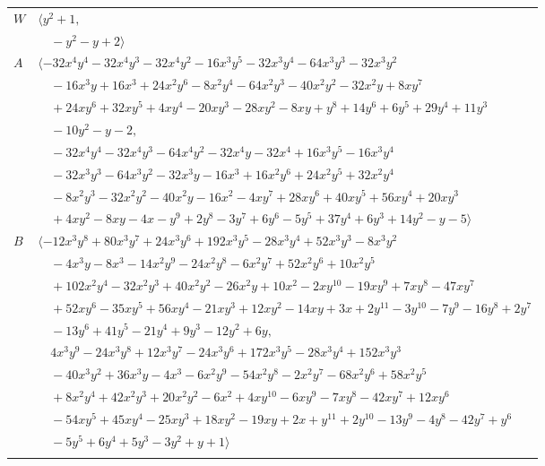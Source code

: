 \documentclass[11pt]{article}
\begin{document}
\begin{longtable}{@{}ll@{}}
$W$ & $\langle y^{2}+1,$\\
 & $\quad -y^{2}-y+2\rangle$\\
$A$ & $\langle -32x^{4}y^{4}-32x^{4}y^{3}-32x^{4}y^{2}-16x^{3}y^{5}-32x^{3}y^{4}-64x^{3}y^{3}-32x^{3}y^{2}$\\
 & $\quad -16x^{3}y+16x^{3}+24x^{2}y^{6}-8x^{2}y^{4}-64x^{2}y^{3}-40x^{2}y^{2}-32x^{2}y+8xy^{7}$\\
 & $\quad +24xy^{6}+32xy^{5}+4xy^{4}-20xy^{3}-28xy^{2}-8xy+y^{8}+14y^{6}+6y^{5}+29y^{4}+11y^{3}$\\
 & $\quad -10y^{2}-y-2,$\\
 & $\quad -32x^{4}y^{4}-32x^{4}y^{3}-64x^{4}y^{2}-32x^{4}y-32x^{4}+16x^{3}y^{5}-16x^{3}y^{4}$\\
 & $\quad -32x^{3}y^{3}-64x^{3}y^{2}-32x^{3}y-16x^{3}+16x^{2}y^{6}+24x^{2}y^{5}+32x^{2}y^{4}$\\
 & $\quad -8x^{2}y^{3}-32x^{2}y^{2}-40x^{2}y-16x^{2}-4xy^{7}+28xy^{6}+40xy^{5}+56xy^{4}+20xy^{3}$\\
 & $\quad +4xy^{2}-8xy-4x-y^{9}+2y^{8}-3y^{7}+6y^{6}-5y^{5}+37y^{4}+6y^{3}+14y^{2}-y-5\rangle$\\
$B$ & $\langle -12x^{3}y^{8}+80x^{3}y^{7}+24x^{3}y^{6}+192x^{3}y^{5}-28x^{3}y^{4}+52x^{3}y^{3}-8x^{3}y^{2}$\\
 & $\quad -4x^{3}y-8x^{3}-14x^{2}y^{9}-24x^{2}y^{8}-6x^{2}y^{7}+52x^{2}y^{6}+10x^{2}y^{5}$\\
 & $\quad +102x^{2}y^{4}-32x^{2}y^{3}+40x^{2}y^{2}-26x^{2}y+10x^{2}-2xy^{10}-19xy^{9}+7xy^{8}-47xy^{7}$\\
 & $\quad +52xy^{6}-35xy^{5}+56xy^{4}-21xy^{3}+12xy^{2}-14xy+3x+2y^{11}-3y^{10}-7y^{9}-16y^{8}+2y^{7}$\\
 & $\quad -13y^{6}+41y^{5}-21y^{4}+9y^{3}-12y^{2}+6y,$\\
 & $\quad 4x^{3}y^{9}-24x^{3}y^{8}+12x^{3}y^{7}-24x^{3}y^{6}+172x^{3}y^{5}-28x^{3}y^{4}+152x^{3}y^{3}$\\
 & $\quad -40x^{3}y^{2}+36x^{3}y-4x^{3}-6x^{2}y^{9}-54x^{2}y^{8}-2x^{2}y^{7}-68x^{2}y^{6}+58x^{2}y^{5}$\\
 & $\quad +8x^{2}y^{4}+42x^{2}y^{3}+20x^{2}y^{2}-6x^{2}+4xy^{10}-6xy^{9}-7xy^{8}-42xy^{7}+12xy^{6}$\\
 & $\quad -54xy^{5}+45xy^{4}-25xy^{3}+18xy^{2}-19xy+2x+y^{11}+2y^{10}-13y^{9}-4y^{8}-42y^{7}+y^{6}$\\
 & $\quad -5y^{5}+6y^{4}+5y^{3}-3y^{2}+y+1\rangle$\\
\addlinespace[2pt]
\multicolumn{2}{@{}p{0.97\textwidth}@{}}{$i=7$, $D_i=1$, $\rho_{ij}$: $11{:}2, \allowbreak 12{:}2, \allowbreak 16{:}1, \allowbreak 20{:}2$}\\

\end{longtable}
\end{document}
